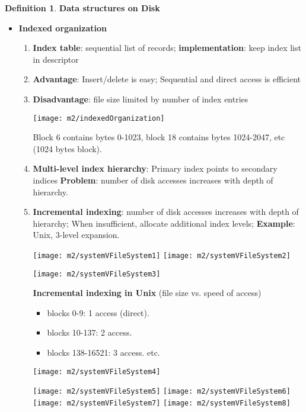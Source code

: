 \documentclass[11pt,a4paper]{article}
\theoremstyle{definition}
\newtheorem{definition}{Definition}[section]
\newenvironment{myitemize}
{ \begin{itemize}
    \setlength{\itemsep}{5pt}
    \setlength{\parskip}{0pt}
    \setlength{\parsep}{0pt}     }
{ \end{itemize}                  }
\newenvironment{myenumerate}
{ \begin{enumerate}
    \setlength{\itemsep}{5pt}
    \setlength{\parskip}{0pt}
    \setlength{\parsep}{0pt}     }
{ \end{enumerate}                }
\begin{document}
\begin{definition}{\textbf{Data structures on Disk}}
\begin{myitemize}
		\item \textbf{Indexed organization}
		\begin{myenumerate}
			\item \textbf{Index table}: sequential list of records; \textbf{implementation}: keep index list in descriptor 
			\item \textbf{Advantage}: Insert/delete is easy; Sequential and direct access is efficient
			\item \textbf{Disadvantage}: file size limited by number of index entries
			
			\texttt{[image: m2/indexedOrganization]}
			
			Block 6 contains bytes 0-1023, block 18 contains bytes 1024-2047, etc (1024 bytes block).
			
			\item \textbf{Multi-level index hierarchy}: Primary index points to secondary indices \textbf{Problem}: number of disk accesses increases with depth of hierarchy.
			\item \textbf{Incremental indexing}: number of disk accesses increases with depth of hierarchy; When insufficient, allocate additional index levels; \textbf{Example}: Unix, 3-level expansion.
			
			\texttt{[image: m2/systemVFileSystem1]}
			\texttt{[image: m2/systemVFileSystem2]}
			
			\begin{minipage}{0.5\linewidth}
				\texttt{[image: m2/systemVFileSystem3]}
			\end{minipage}
			\begin{minipage}{0.5\linewidth}
				\textbf{Incremental indexing in Unix} (file size vs. speed of access)
				\begin{myitemize}
					\item blocks 0-9: 1 access (direct).
					\item blocks 10-137: 2 access.
					\item blocks 138-16521: 3 access. etc.
				\end{myitemize}
				
				\texttt{[image: m2/systemVFileSystem4]}
			\end{minipage}
			
			\texttt{[image: m2/systemVFileSystem5]}
			\texttt{[image: m2/systemVFileSystem6]}
			\texttt{[image: m2/systemVFileSystem7]}
			\texttt{[image: m2/systemVFileSystem8]}
		\end{myenumerate}
	\end{myitemize}
\end{definition}
\end{document}
